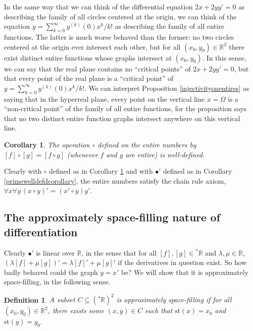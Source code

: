 \documentclass[microtype]{jloganal}
\newtheorem{corollary}[theorem]{Corollary}
\newtheorem{definition}[theorem]{Definition}
\begin{document}
In the same way that we can think of the differential equation
$2x+2yy'=0$ as describing the family of all circles centered at the origin,
we can think of the equation
$y=\sum_{k=0}^\infty y^{(k)}(0)x^k/k!$ as describing the
family of all entire functions. The latter is much worse behaved than the
former: no two circles centered at the origin ever intersect each other,
but for all $(x_0,y_0)\in\mathbb R^2$ there exist distinct entire functions
whose graphs intersect at $(x_0,y_0)$. In this sense, we can say that the
real plane contains no ``critical points'' of $2x+2yy'=0$, but that every
point of the real plane is a ``critical point'' of
$y=\sum_{k=0}^\infty y^{(k)}(0)x^k/k!$.
We can interpret Proposition \ref{injectivityonentires} as saying that in
the hyperreal plane, every point on the vertical line $x=\Omega$ is a
``non-critical point'' of the family of all entire functions, for
the proposition says that no two distinct entire function graphs intersect
anywhere on this vertical line.

\begin{corollary}
\label{compositioncorollary}
    The operation $\circ$ defined on the entire numbers by
    $[f]\circ[g]=[f\circ g]$ (whenever $f$ and $g$ are entire)
    is well-defined.
\end{corollary}

Clearly with $\circ$ defined as in Corollary \ref{compositioncorollary} and
with $\bullet'$ defined as in Corollary \ref{primewelldefdcorollary},
the entire numbers satisfy the chain rule axiom,
$\forall x\forall y\,(x\circ y)'=(x'\circ y)y'$.

\subsection{The approximately space-filling nature of differentiation}

Clearly $\bullet'$ is linear over $\mathbb R$, in the sense that for all
$[f],[g]\in{}^*\mathbb R$ and $\lambda,\mu\in\mathbb R$,
$(\lambda[f]+\mu[g])'=\lambda [f]'+\mu [g]'$ if the derivatives
in question exist.
So how badly behaved could the graph $y=x'$ be?
We will show that it is approximately space-filling,
in the following sense.

\begin{definition}
    A subset $C\subseteq ({}^*\mathbb R)^2$
    is \emph{approximately space-filling} if for all
    $(x_0,y_0)\in\mathbb R^2$, there exists some $(x,y)\in C$
    such that $\mathrm{st}(x)=x_0$ and $\mathrm{st}(y)=y_0$.
\end{definition}
\end{document}
